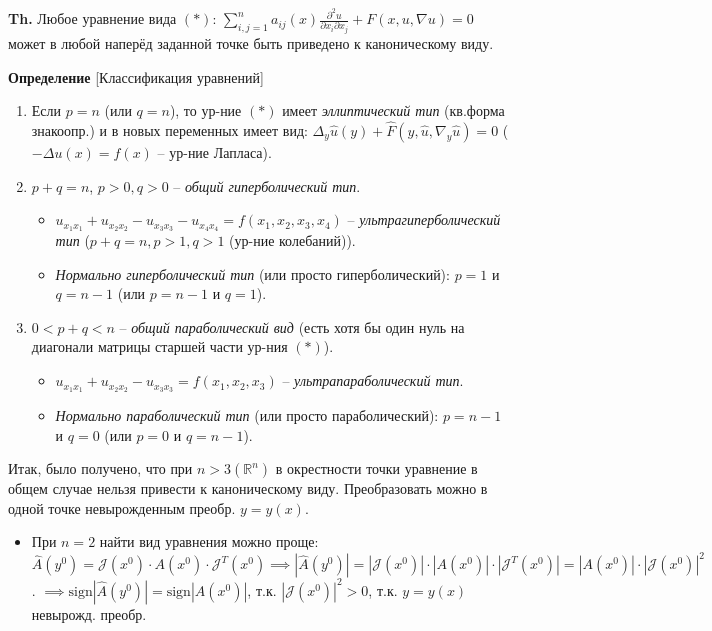 \documentclass[12pt, a4paper]{article}
\begin{document}
\textbf{Th.} Любое уравнение вида $(*)$: $\sum_{i,j=1}^n a_{ij}(x) \frac{\partial^2 u}{\partial x_i \partial x_j} + F(x,u,\nabla u) = 0$ может в любой наперёд заданной точке быть приведено к каноническому виду.

\textbf{Определение} [Классификация уравнений]
\begin{enumerate}
    \item Если $p=n$ (или $q=n$), то ур-ние $(*)$ имеет \textit{эллиптический тип} (кв.форма знакоопр.) и в новых переменных имеет вид: $\Delta_y \hat{u}(y) + \hat{F}(y, \hat{u}, \nabla_y \hat{u}) = 0$ ($-\Delta u(x) = f(x)$ -- ур-ние Лапласа).
    \item $p+q=n$, $p>0, q>0$ -- \textit{общий гиперболический тип}.
    \begin{itemize}
        \item $u_{x_1x_1} + u_{x_2x_2} - u_{x_3x_3} - u_{x_4x_4} = f(x_1, x_2, x_3, x_4)$ -- \textit{ультрагиперболический тип} ($p+q=n, p>1, q>1$ (ур-ние колебаний)).
        \item \textit{Нормально гиперболический тип} (или просто гиперболический): $p=1$ и $q=n-1$ (или $p=n-1$ и $q=1$).
    \end{itemize}
    \item $0 < p+q < n$ -- \textit{общий параболический вид} (есть хотя бы один нуль на диагонали матрицы старшей части ур-ния $(*)$).
    \begin{itemize}
        \item $u_{x_1x_1} + u_{x_2x_2} - u_{x_3x_3} = f(x_1,x_2,x_3)$ -- \textit{ультрапараболический тип}.
        \item \textit{Нормально параболический тип} (или просто параболический): $p=n-1$ и $q=0$ (или $p=0$ и $q=n-1$).
    \end{itemize}
\end{enumerate}
Итак, было получено, что при $n>3 (\mathbb{R}^n)$ в окрестности точки уравнение в общем случае нельзя привести к каноническому виду. Преобразовать можно в одной точке невырожденным преобр. $y=y(x)$.



\begin{itemize}
    \item При $n=2$ найти вид уравнения можно проще:
    $\hat{A}(y^0) = \mathcal{J}(x^0) \cdot A(x^0) \cdot \mathcal{J}^T(x^0) \implies |\hat{A}(y^0)| = |\mathcal{J}(x^0)| \cdot |A(x^0)| \cdot |\mathcal{J}^T(x^0)| = |A(x^0)| \cdot |\mathcal{J}(x^0)|^2$.
    $\implies \text{sign}|\hat{A}(y^0)| = \text{sign}|A(x^0)|$, т.к. $|\mathcal{J}(x^0)|^2 > 0$, т.к. $y=y(x)$ невырожд. преобр.
\end{itemize}
\end{document}

